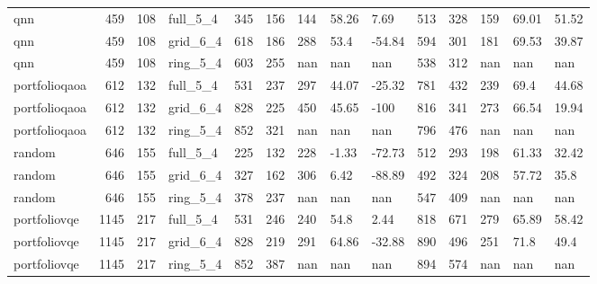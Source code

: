 \begin{longtable}{lrrlrrlllrrlll}
qnn & 459 & 108 & full\_5\_4 & 345 & 156 & 144 & 58.26 & 7.69 & 513 & 328 & 159 & 69.01 & 51.52 \\
qnn & 459 & 108 & grid\_6\_4 & 618 & 186 & 288 & 53.4 & -54.84 & 594 & 301 & 181 & 69.53 & 39.87 \\
qnn & 459 & 108 & ring\_5\_4 & 603 & 255 & nan & nan & nan & 538 & 312 & nan & nan & nan \\
portfolioqaoa & 612 & 132 & full\_5\_4 & 531 & 237 & 297 & 44.07 & -25.32 & 781 & 432 & 239 & 69.4 & 44.68 \\
portfolioqaoa & 612 & 132 & grid\_6\_4 & 828 & 225 & 450 & 45.65 & -100 & 816 & 341 & 273 & 66.54 & 19.94 \\
portfolioqaoa & 612 & 132 & ring\_5\_4 & 852 & 321 & nan & nan & nan & 796 & 476 & nan & nan & nan \\
random & 646 & 155 & full\_5\_4 & 225 & 132 & 228 & -1.33 & -72.73 & 512 & 293 & 198 & 61.33 & 32.42 \\
random & 646 & 155 & grid\_6\_4 & 327 & 162 & 306 & 6.42 & -88.89 & 492 & 324 & 208 & 57.72 & 35.8 \\
random & 646 & 155 & ring\_5\_4 & 378 & 237 & nan & nan & nan & 547 & 409 & nan & nan & nan \\
portfoliovqe & 1145 & 217 & full\_5\_4 & 531 & 246 & 240 & 54.8 & 2.44 & 818 & 671 & 279 & 65.89 & 58.42 \\
portfoliovqe & 1145 & 217 & grid\_6\_4 & 828 & 219 & 291 & 64.86 & -32.88 & 890 & 496 & 251 & 71.8 & 49.4 \\
portfoliovqe & 1145 & 217 & ring\_5\_4 & 852 & 387 & nan & nan & nan & 894 & 574 & nan & nan & nan \\
\end{longtable}
